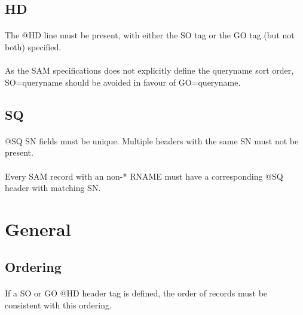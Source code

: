 \documentclass[10pt]{article}
\begin{document}
\subsection{HD}

\paragraph{}

The @HD line must be present, with either the SO tag or the GO tag (but not both) specified.

\paragraph{}

As the SAM specifications does not explicitly define the queryname sort order, SO=queryname
should be avoided in favour of GO=queryname.

\subsection{SQ}

\paragraph{}

@SQ SN fields must be unique. Multiple headers with the same SN must not be present.

\paragraph{}

Every SAM record with an non-* RNAME must have a corresponding @SQ header with matching SN.

\section{General}

\subsection{Ordering}

\paragraph{}

If a SO or GO @HD header tag is defined, the order of records must be consistent with this ordering.
\end{document}

